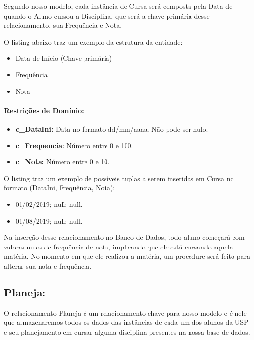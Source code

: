 \documentclass{report}
\begin{document}
  Segundo nosso modelo, cada instância de Cursa será composta pela Data de quando o Aluno cursou a Disciplina, que será a chave primária desse relacionamento, sua Frequência e Nota.
  
  O listing abaixo traz um exemplo da estrutura da entidade:
\begin{itemize}
  \item Data de Início (Chave primária)
  \item Frequência
  \item Nota
\end{itemize}
\paragraph{Restrições de Domínio:}
\begin{itemize}
  \item \textbf{c\_DataIni:} Data no formato dd/mm/aaaa. Não pode ser nulo.
  \item \textbf{c\_Frequencia:} Número entre 0 e 100.
  \item \textbf{c\_Nota:} Número entre 0 e 10.
\end{itemize}
O listing traz um exemplo de possíveis tuplas a serem inseridas em Cursa no formato (DataIni, Frequência, Nota):

\begin{itemize}
  \item 01/02/2019; null; null.
  \item 01/08/2019; null; null.
\end{itemize}
Na inserção desse relacionamento no Banco de Dados, todo aluno começará com valores nulos de frequência de nota, implicando que ele está cursando aquela matéria. No momento em que ele realizou a matéria, um procedure será feito para alterar sua nota e frequência.
\subsection{Planeja:}
O relacionamento Planeja é um relacionamento chave para nosso modelo e é nele que armazenaremos todos os dados das instâncias de cada um dos alunos da USP e seu planejamento em cursar alguma disciplina presentes na nossa base de dados.
  
\end{document}
